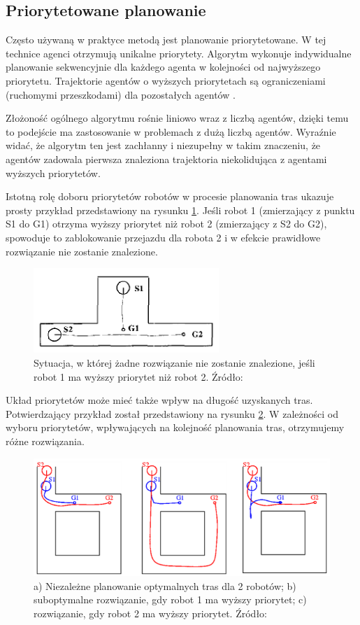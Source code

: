 \subsection{Priorytetowane planowanie}
Często używaną w praktyce metodą jest planowanie priorytetowane. 
W tej technice agenci otrzymują unikalne priorytety. Algorytm wykonuje indywidualne planowanie sekwencyjnie dla każdego agenta w kolejności od najwyższego priorytetu. Trajektorie agentów o wyższych priorytetach są ograniczeniami (ruchomymi przeszkodami) dla pozostałych agentów \cite{async_decentralized_spacetime_cp}.

Złożoność ogólnego algorytmu rośnie liniowo wraz z liczbą agentów, dzięki temu to podejście ma zastosowanie w problemach z dużą liczbą agentów.
Wyraźnie widać, że algorytm ten jest zachłanny i niezupełny w takim znaczeniu, że agentów zadowala pierwsza znaleziona trajektoria niekolidująca z agentami wyższych priorytetów. 

Istotną rolę doboru priorytetów robotów w procesie planowania tras ukazuje prosty przykład przedstawiony na rysunku \ref{fig:image_article1_fig1}. Jeśli robot 1 (zmierzający z punktu S1 do G1) otrzyma wyższy priorytet niż robot 2 (zmierzający z S2 do G2), spowoduje to zablokowanie przejazdu dla robota 2 i w efekcie prawidłowe rozwiązanie nie zostanie znalezione.
\begin{figure}
	\centering
	\includegraphics[width=7cm]{img/article1/fig1}
	\caption{Sytuacja, w której żadne rozwiązanie nie zostanie znalezione, jeśli robot 1 ma wyższy priorytet niż robot 2. Źródło: \cite{optpriorities}}
	\label{fig:image_article1_fig1}
\end{figure}

Układ priorytetów może mieć także wpływ na długość uzyskanych tras. Potwierdzający przykład został przedstawiony na rysunku \ref{fig:image_article1_ppt6}. W zależności od wyboru priorytetów, wpływających na kolejność planowania tras, otrzymujemy różne rozwiązania.
\begin{figure}
	\centering
	\includegraphics[width=13cm]{img/article1/ppt6}
	\caption{a) Niezależne planowanie optymalnych tras dla 2 robotów; b) suboptymalne rozwiązanie, gdy robot 1 ma wyższy priorytet; c) rozwiązanie, gdy robot 2 ma wyższy priorytet. Źródło: \cite{optpriorities}}
	\label{fig:image_article1_ppt6}
\end{figure}
